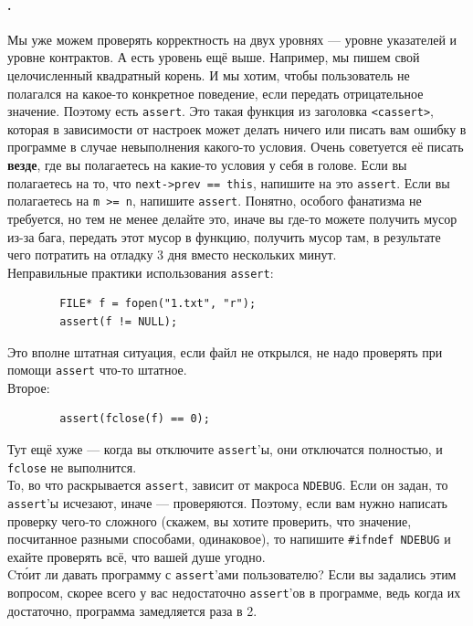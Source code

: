 \documentclass{article}
\begin{document}
    \paragraph{.}
    Мы уже можем проверять корректность на двух уровнях --- уровне указателей и уровне контрактов. А есть уровень ещё выше. Например, мы пишем свой целочисленный квадратный корень. И мы хотим, чтобы пользователь не полагался на какое-то конкретное поведение, если передать отрицательное значение. Поэтому есть \texttt{assert}. Это такая функция из заголовка \texttt{<cassert>}, которая в зависимости от настроек может делать ничего или писать вам ошибку в программе в случае невыполнения какого-то условия. Очень советуется её писать \textbf{везде}, где вы полагаетесь на какие-то условия у себя в голове. Если вы полагаетесь на то, что \texttt{next->prev == this}, напишите на это \texttt{assert}. Если вы полагаетесь на \texttt{m >= n}, напишите \texttt{assert}. Понятно, особого фанатизма не требуется, но тем не менее делайте это, иначе вы где-то можете получить мусор из-за бага, передать этот мусор в функцию, получить мусор там, в результате чего потратить на отладку 3 дня вместо нескольких минут.\\
    Неправильные практики использования \texttt{assert}:
    \begin{verbatim}
        FILE* f = fopen("1.txt", "r");
        assert(f != NULL);
    \end{verbatim}
    Это вполне штатная ситуация, если файл не открылся, не надо проверять при помощи \texttt{assert} что-то штатное.\\
    Второе:
    \begin{verbatim}
        assert(fclose(f) == 0);
    \end{verbatim}
    Тут ещё хуже --- когда вы отключите \texttt{assert}'ы, они отключатся полностью, и \texttt{fclose} не выполнится.\\
    То, во что раскрывается \texttt{assert}, зависит от макроса \texttt{NDEBUG}. Если он задан, то \texttt{assert}'ы исчезают, иначе --- проверяются. Поэтому, если вам нужно написать проверку чего-то сложного (скажем, вы хотите проверить, что значение, посчитанное разными способами, одинаковое), то напишите \texttt{#ifndef NDEBUG} и ехайте проверять всё, что вашей душе угодно.\\
    Cт\'{о}ит ли давать программу с \texttt{assert}'ами пользователю? Если вы задались этим вопросом, скорее всего у вас недостаточно \texttt{assert}'ов в программе, ведь когда их достаточно, программа замедляется раза в 2.
\end{document}
